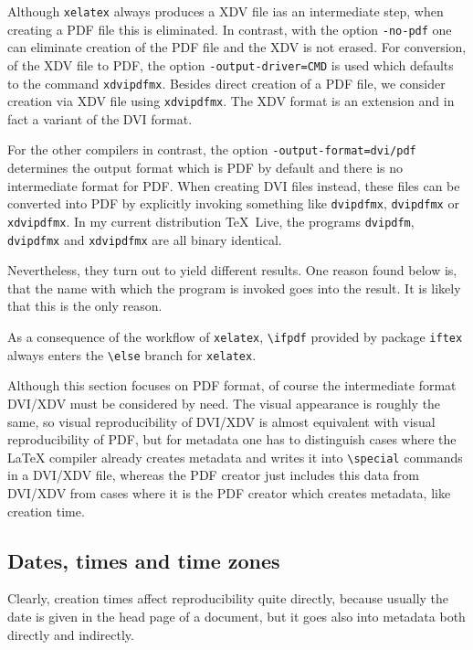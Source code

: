 \documentclass[a4paper, english]{article}%
\newcommand{\xelatex}{\texttt{xelatex}}
\newcommand{\cmd}[1]{\texttt{\textbackslash#1}}
\newcommand{\texlive}{\TeX~Live}
\begin{document}
Although \xelatex{} always produces a XDV file ias an intermediate step, 
when creating a PDF file this is eliminated. 
In contrast, with the option \texttt{-no-pdf} 
one can eliminate creation of the PDF file and the XDV is not erased. 
For conversion, of the XDV file to PDF, the option \texttt{-output-driver=CMD} 
is used which defaults to the command \texttt{xdvipdfmx}. 
Besides direct creation of a PDF file, 
we consider creation via XDV file using \texttt{xdvipdfmx}. 
The XDV format is an extension and in fact a variant of the DVI format. 

For the other compilers in contrast, the option \texttt{-output-format=dvi/pdf} 
determines the output format which is PDF by default 
and there is no intermediate format for PDF\@. 
When creating DVI files instead, these files can be converted into PDF 
by explicitly invoking something like 
\texttt{dvipdfmx}, \texttt{dvipdfmx} or \texttt{xdvipdfmx}. 
In my current distribution \texlive, 
the programs \texttt{dvipdfm}, \texttt{dvipdfmx} and \texttt{xdvipdfmx} 
are all binary identical. 

Nevertheless, they turn out to yield different results. 
One reason found below is, 
that the name with which the program is invoked 
goes into the result. 
It is likely that this is the only reason. 

As a consequence of the workflow of \xelatex, 
\cmd{ifpdf} provided by package \texttt{iftex} 
always enters the \cmd{else} branch for \xelatex. 

Although this section focuses on PDF format, 
of course the intermediate format DVI/XDV must be considered by need. 
The visual appearance is roughly the same, so visual reproducibility of DVI/XDV 
is almost equivalent with visual reproducibility of PDF, 
but for metadata one has to distinguish cases where the \LaTeX{} compiler already creates metadata 
and writes it into \cmd{special} commands in a DVI/XDV file, 
whereas the PDF creator just includes this data from DVI/XDV 
from cases where it is the PDF creator which creates metadata, like creation time. 


\subsection{Dates, times and time zones}\label{subsec:dateTime}

Clearly, creation times affect reproducibility quite directly, 
because usually the date is given in the head page of a document, 
but it goes also into metadata both directly and indirectly. 
\end{document}
